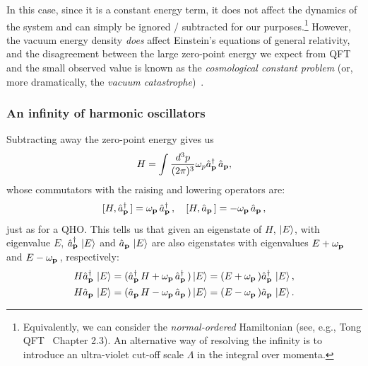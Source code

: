 In this case, since it is a constant energy term, it does not affect the dynamics of the system and can simply be ignored / subtracted for our purposes.\footnote{Equivalently, we can consider the \textit{normal-ordered} Hamiltonian (see, e.g., Tong QFT~\cite{TongQFT} Chapter 2.3).
An alternative way of resolving the infinity is to introduce an ultra-violet cut-off scale $\Lambda$ in the integral over momenta.}
However, the vacuum energy density \textit{does} affect Einstein's equations of general relativity, and the disagreement between the large zero-point energy we expect from QFT and the small observed value is known as the \textit{cosmological constant problem} (or, more dramatically, the \textit{vacuum catastrophe})~\cite{Adler:1995vd, Bengochea:2019daa}.

\subsubsection{An infinity of harmonic oscillators}

Subtracting away the zero-point energy gives us
\begin{equation}
    \label{eq:01_qft_quantization_hamiltonian}
    H = \int \frac{d^3p}{(2\pi)^3} \omega_p \hat a^\dagger_{\mathbf{p}}\,\hat a_{\mathbf{p}},
\end{equation}
whose commutators with the raising and lowering operators are:
\begin{equation}
    \label{eq:01_qft_quantization_hamiltonian_commutators}
    [H, \hat a^\dagger_{\mathbf{p}}\,] = \omega_{\mathbf{p}}\, \hat a^\dagger_{\mathbf{p}}\,, \quad [H, \hat a_{\mathbf{p}}\,] = -\omega_{\mathbf{p}}\, \hat a_{\mathbf{p}}\,,
\end{equation}
just as for a QHO.
This tells us that given an eigenstate of $H$, $\ket{E}$, with eigenvalue $E$, $\hat a^\dagger_{\mathbf{p}}\, \ket{E}$ and $\hat a_{\mathbf{p}}\, \ket{E}$ are also eigenstates with eigenvalues $E + \omega_{\mathbf{p}}\,$ and $E - \omega_{\mathbf{p}}\,$, respectively:
\begin{equation}
    \label{eq:01_qft_quantization_hamiltonian_eigenstates}
    \begin{split}
        H\hat a^\dagger_{\mathbf{p}}\, \ket{E} &= (\hat a^\dagger_{\mathbf{p}}\, H + \omega_{\mathbf{p}}\, \hat a^\dagger_{\mathbf{p}}\,) \ket{E} = (E + \omega_{\mathbf{p}}\,) \hat a^\dagger_{\mathbf{p}}\, \ket{E}, \\
        H\hat a_{\mathbf{p}}\, \ket{E} &= (\hat a_{\mathbf{p}}\, H - \omega_{\mathbf{p}}\, \hat a_{\mathbf{p}}\,) \ket{E} = (E - \omega_{\mathbf{p}}\,) \hat a_{\mathbf{p}}\, \ket{E}.
    \end{split}
\end{equation}

